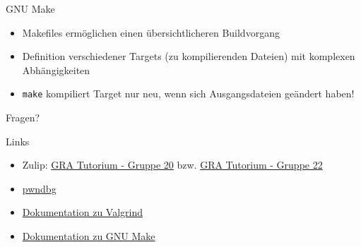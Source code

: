 \documentclass[
  german,            %
  aspectratio=169,    %
]{tumbeamer}
\begin{document}
\begin{frame}[c, fragile]{GNU Make}{}
  \begin{itemize}
    \item Makefiles ermöglichen einen übersichtlicheren Buildvorgang
    \item Definition verschiedener Targets (zu kompilierenden Dateien) mit komplexen Abhängigkeiten
    \item \verb|make| kompiliert Target nur neu, wenn sich Ausgangsdateien geändert haben!
  \end{itemize}
\end{frame}

\begin{frame}[c]{}{}
  \begin{center}
    \LARGE Fragen?
  \end{center}
\end{frame}

\begin{frame}[fragile, c]{Links}{}
  \begin{itemize}
    \item Zulip: \href{https://zulip.in.tum.de/#narrow/stream/2267-GRA-Tutorium---Gruppe-20}{\glqq GRA Tutorium - Gruppe 20\grqq}
          bzw. \href{https://zulip.in.tum.de/#narrow/stream/2269-GRA-Tutorium---Gruppe-22}{\glqq GRA Tutorium - Gruppe 22\grqq}
    \item \href{https://github.com/pwndbg/pwndbg}{pwndbg}
    \item \href{https://valgrind.org/docs/manual/manual.html}{Dokumentation zu Valgrind}
    \item \href{https://www.gnu.org/software/make/manual/html_node/index.html}{Dokumentation zu GNU Make}
  \end{itemize}
\end{frame}

\maketitle
\end{document}
